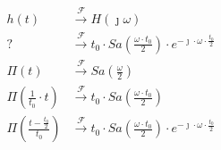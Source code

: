 \begin{task}
\begin{align*}
h(t) &\xrightarrow{\mathcal F} H(\jmath \omega)\\
? &\xrightarrow{\mathcal F} t_0 \cdot Sa\left(\frac{\omega \cdot t_0}{2}\right) \cdot e^{-\jmath \cdot \omega \cdot \frac{t_0}{2}}\\
\Pi(t) &\xrightarrow{\mathcal F} Sa\left(\frac{\omega}{2}\right)\\
\Pi\left(\frac{1}{t_0} \cdot t \right) &\xrightarrow{\mathcal F} t_0 \cdot Sa\left(\frac{\omega \cdot t_0}{2}\right)\\
\Pi\left(\frac{t-\frac{t_0}{2}}{t_0}\right) &\xrightarrow{\mathcal F} t_0 \cdot Sa\left(\frac{\omega \cdot t_0}{2}\right) \cdot e^{-\jmath \cdot \omega \cdot \frac{t_0}{2}}\\
\end{align*}




\end{task}

